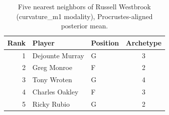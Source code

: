 \begin{table}[htbp]
  \centering\small
  \begin{tabular}{rllc}
    \toprule
    Rank & Player & Position & Archetype \\
    \midrule
    1 & Dejounte Murray & G & 3 \\
    2 & Greg Monroe & F & 2 \\
    3 & Tony Wroten & G & 4 \\
    4 & Charles Oakley & F & 3 \\
    5 & Ricky Rubio & G & 2 \\
    \bottomrule
  \end{tabular}
  \caption{Five nearest neighbors of Russell Westbrook (curvature_m1 modality), Procrustes-aligned posterior mean.}
  \label{tab:Russell_Westbrook_neighbors_curvature_m1}
\end{table}

